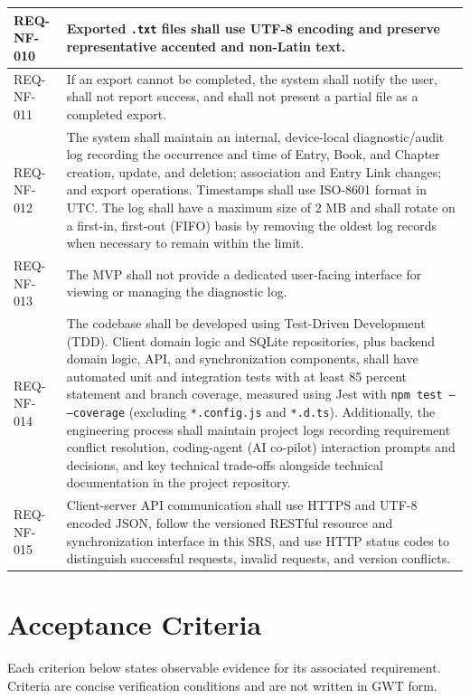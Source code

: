\documentclass[11pt,a4paper]{article}
\begin{document}
\begin{longtable}{|L{2.4cm}|L{13.6cm}|}
REQ-NF-010 & Exported \texttt{.txt} files shall use UTF-8 encoding and preserve representative accented and non-Latin text. \\ \hline
REQ-NF-011 & If an export cannot be completed, the system shall notify the user, shall not report success, and shall not present a partial file as a completed export. \\ \hline
REQ-NF-012 & The system shall maintain an internal, device-local diagnostic/audit log recording the occurrence and time of Entry, Book, and Chapter creation, update, and deletion; association and Entry Link changes; and export operations. Timestamps shall use ISO-8601 format in UTC. The log shall have a maximum size of 2 MB and shall rotate on a first-in, first-out (FIFO) basis by removing the oldest log records when necessary to remain within the limit. \\ \hline
REQ-NF-013 & The MVP shall not provide a dedicated user-facing interface for viewing or managing the diagnostic log. \\ \hline
REQ-NF-014 & The codebase shall be developed using Test-Driven Development (TDD). Client domain logic and SQLite repositories, plus backend domain logic, API, and synchronization components, shall have automated unit and integration tests with at least 85 percent statement and branch coverage, measured using Jest with \texttt{npm test -- --coverage} (excluding \texttt{*.config.js} and \texttt{*.d.ts}). Additionally, the engineering process shall maintain project logs recording requirement conflict resolution, coding-agent (AI co-pilot) interaction prompts and decisions, and key technical trade-offs alongside technical documentation in the project repository. \\ \hline
REQ-NF-015 & Client-server API communication shall use HTTPS and UTF-8 encoded JSON, follow the versioned RESTful resource and synchronization interface in this SRS, and use HTTP status codes to distinguish successful requests, invalid requests, and version conflicts. \\ \hline
\end{longtable}

\section{Acceptance Criteria}
Each criterion below states observable evidence for its associated requirement. Criteria are concise verification conditions and are not written in GWT form.
\end{document}
